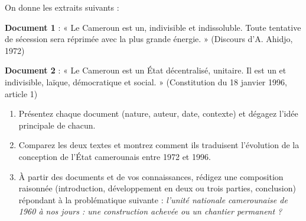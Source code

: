 \documentclass[11pt]{article}
\begin{document}
\begin{exercice}
On donne les extraits suivants :

\textbf{Document 1} : « Le Cameroun est un, indivisible et indissoluble. Toute tentative de sécession sera réprimée avec la plus grande énergie. » (Discours d'A. Ahidjo, 1972)

\textbf{Document 2} : « Le Cameroun est un État décentralisé, unitaire. Il est un et indivisible, laïque, démocratique et social. » (Constitution du 18 janvier 1996, article 1\ier{})

\begin{enumerate}
\item Présentez chaque document (nature, auteur, date, contexte) et dégagez l'idée principale de chacun.
\item Comparez les deux textes et montrez comment ils traduisent l'évolution de la conception de l'État camerounais entre 1972 et 1996.
\item À partir des documents et de vos connaissances, rédigez une composition raisonnée (introduction, développement en deux ou trois parties, conclusion) répondant à la problématique suivante : \textit{l'unité nationale camerounaise de 1960 à nos jours : une construction achevée ou un chantier permanent ?}
\end{enumerate}
\end{exercice}
\end{document}
